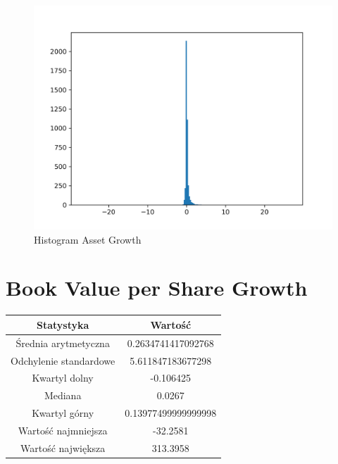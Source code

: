 \documentclass{article}
\begin{document}
\begin{figure}[h!]
    \includegraphics[width=\linewidth]{variables/Asset Growth.png}
    \caption{Histogram Asset Growth }
\end{figure}\section{ Book Value per Share Growth }

\begin{center}
    \begin{tabular}{|c | c|} 
    \hline
    Statystyka & Wartość \\
    \hline\hline
    Średnia arytmetyczna & 0.2634741417092768 \\ 
    \hline
    Odchylenie standardowe & 5.611847183677298 \\
    \hline
    Kwartyl dolny & -0.106425 \\
    \hline
    Mediana & 0.0267 \\
    \hline
    Kwartyl górny & 0.13977499999999998 \\
    \hline
    Wartość najmniejsza & -32.2581 \\
    \hline
    Wartość największa & 313.3958 \\
    \hline
   \end{tabular}
\end{center}
\end{document}
